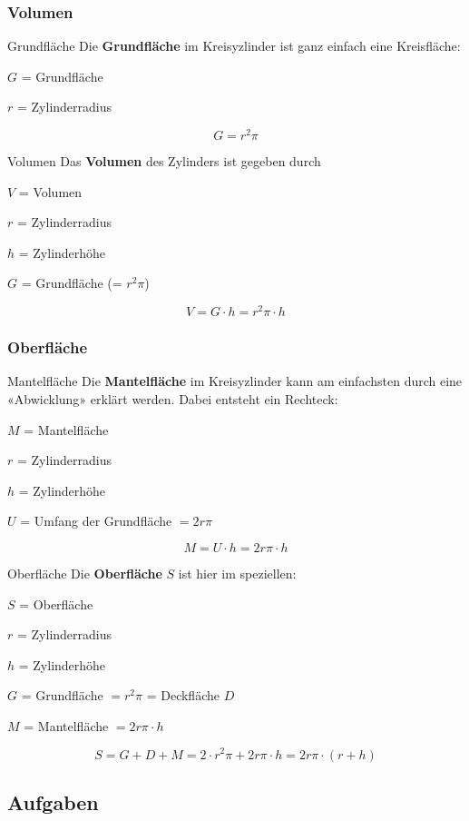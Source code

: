 \subsubsection{Volumen}

\begin{bemerkung}{Grundfläche}{}
  Die \textbf{Grundfläche} im Kreisyzlinder ist ganz einfach eine Kreisfläche:

  $G$ = Grundfläche

  $r$ = Zylinderradius
  
  $$G = r^2\pi$$
\end{bemerkung}

\begin{gesetz}{Volumen}{}
  Das \textbf{Volumen} des Zylinders ist gegeben durch

  $V$ = Volumen

  $r$ = Zylinderradius

  $h$ = Zylinderhöhe

  $G$ = Grundfläche (= $r^2\pi$)

  $$V = G\cdot{}h = r^2\pi\cdot{} h $$
\end{gesetz}
\newpage

\subsubsection{Oberfläche}


\begin{bemerkung}{Mantelfläche}{}
  Die \textbf{Mantelfläche} im Kreisyzlinder kann am einfachsten durch eine «Abwicklung» erklärt werden. Dabei entsteht ein Rechteck:

  $M$ = Mantelfläche

  $r$ = Zylinderradius

  $h$ = Zylinderhöhe

  $U$ = Umfang der Grundfläche $= 2r\pi$
  
  $$M = U\cdot{}h = 2r\pi\cdot{}h$$
\end{bemerkung}

\begin{gesetz}{Oberfläche}{}
  Die \textbf{Oberfläche} $S$ ist hier im speziellen:

  $S$ = Oberfläche

  $r$ = Zylinderradius

  $h$ = Zylinderhöhe

  $G$ = Grundfläche $=r^2\pi$ = Deckfläche $D$

  $M$ = Mantelfläche $=2r\pi\cdot{}h $
  
  $$S = G + D + M = 2\cdot{}r^2\pi + 2r\pi\cdot{}h = 2r\pi\cdot{}(r + h)$$
\end{gesetz}
\newpage

\subsection*{Aufgaben}

\newpage
